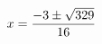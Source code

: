 \documentclass[preview]{standalone}
\begin{document}
\begin{align*}
\special{dvisvgm:raw <g id='unique000'>}x=\frac{-3\pm \sqrt{329}}{16}\special{dvisvgm:raw </g>}
\end{align*}
\end{document}
